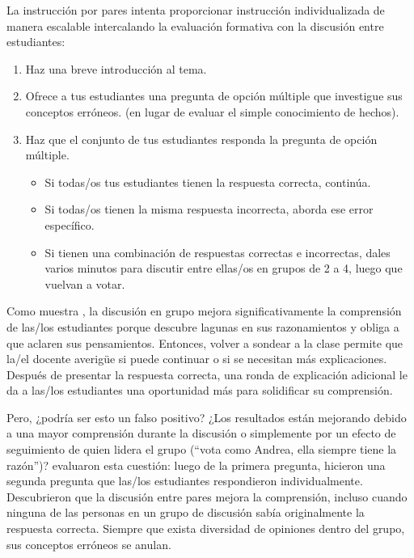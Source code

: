La instrucción por pares intenta proporcionar instrucción individualizada de manera escalable
intercalando la evaluación formativa con la discusión entre estudiantes:

\begin{enumerate}

\item
  Haz una breve introducción al tema.

\item
  Ofrece a tus estudiantes una pregunta de opción múltiple que investigue sus conceptos erróneos.
  (en lugar de evaluar el simple conocimiento de hechos).

\item
  Haz que el conjunto de tus estudiantes responda la pregunta de opción múltiple.

  \begin{itemize}

  \item
    Si todas/os tus estudiantes tienen la respuesta correcta, continúa.

  \item
    Si todas/os tienen la misma respuesta incorrecta,
    aborda ese error específico.

  \item
    Si tienen una combinación de respuestas correctas e incorrectas,
    dales varios minutos para discutir entre ellas/os en grupos de 2 a 4,
    luego que vuelvan a votar.

  \end{itemize}

\end{enumerate}

Como muestra
,
la discusión en grupo mejora significativamente la comprensión de las/los estudiantes
porque descubre lagunas en sus razonamientos y obliga a que aclaren sus pensamientos.
Entonces, volver a sondear a la clase permite que la/el docente averigüe si puede continuar
o si se necesitan más explicaciones.
Después de presentar la respuesta correcta,
una ronda de explicación adicional le da a las/los estudiantes una oportunidad más para solidificar su comprensión.

Pero, ¿podría ser esto un falso positivo?
¿Los resultados están mejorando debido a una mayor comprensión durante la discusión
o simplemente por un efecto de seguimiento de quien lidera el grupo (``vota como Andrea, ella siempre tiene la razón'')?
\cite{Smit2009} evaluaron esta cuestión: luego de la primera pregunta,
hicieron una segunda pregunta
que las/los estudiantes respondieron individualmente.
Descubrieron que la discusión entre pares mejora la comprensión,
incluso cuando ninguna de las personas en un grupo de discusión sabía originalmente la respuesta correcta.
Siempre que exista diversidad de opiniones dentro del grupo,
sus conceptos erróneos se anulan.


